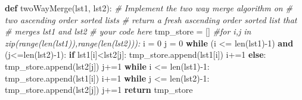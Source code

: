 \documentclass[
]{article}
\newenvironment{Shaded}{}{}
\newcommand{\BuiltInTok}[1]{\textcolor[rgb]{0.00,0.50,0.00}{#1}}
\newcommand{\CommentTok}[1]{\textcolor[rgb]{0.38,0.63,0.69}{\textit{#1}}}
\newcommand{\ControlFlowTok}[1]{\textcolor[rgb]{0.00,0.44,0.13}{\textbf{#1}}}
\newcommand{\DecValTok}[1]{\textcolor[rgb]{0.25,0.63,0.44}{#1}}
\newcommand{\KeywordTok}[1]{\textcolor[rgb]{0.00,0.44,0.13}{\textbf{#1}}}
\newcommand{\NormalTok}[1]{#1}
\newcommand{\OperatorTok}[1]{\textcolor[rgb]{0.40,0.40,0.40}{#1}}
\begin{document}
\begin{Shaded}
\begin{Highlighting}[]
\KeywordTok{def}\NormalTok{ twoWayMerge(lst1, lst2):}
    \CommentTok{\# Implement the two way merge algorithm on }
    \CommentTok{\#          two ascending order sorted lists}
    \CommentTok{\# return a fresh ascending order sorted list that }
    \CommentTok{\#          merges lst1 and lst2}
    \CommentTok{\# your code here}
\NormalTok{    tmp\_store }\OperatorTok{=}\NormalTok{ []}
    \CommentTok{\#for i,j in zip(range(len(lst1)),range(len(lst2))):}
\NormalTok{    i }\OperatorTok{=} \DecValTok{0}
\NormalTok{    j }\OperatorTok{=} \DecValTok{0}
    \ControlFlowTok{while}\NormalTok{ (i }\OperatorTok{\textless{}=} \BuiltInTok{len}\NormalTok{(lst1)}\OperatorTok{{-}}\DecValTok{1}\NormalTok{) }\KeywordTok{and}\NormalTok{ (j}\OperatorTok{\textless{}=}\BuiltInTok{len}\NormalTok{(lst2)}\OperatorTok{{-}}\DecValTok{1}\NormalTok{):}
        \ControlFlowTok{if}\NormalTok{ lst1[i]}\OperatorTok{\textless{}}\NormalTok{lst2[j]:}
\NormalTok{            tmp\_store.append(lst1[i])}
\NormalTok{            i}\OperatorTok{+=}\DecValTok{1}
        \ControlFlowTok{else}\NormalTok{:}
\NormalTok{            tmp\_store.append(lst2[j])}
\NormalTok{            j}\OperatorTok{+=}\DecValTok{1}
    \ControlFlowTok{while}\NormalTok{ i }\OperatorTok{\textless{}=} \BuiltInTok{len}\NormalTok{(lst1)}\OperatorTok{{-}}\DecValTok{1}\NormalTok{:}
\NormalTok{        tmp\_store.append(lst1[i])}
\NormalTok{        i}\OperatorTok{+=}\DecValTok{1}
    \ControlFlowTok{while}\NormalTok{ j }\OperatorTok{\textless{}=} \BuiltInTok{len}\NormalTok{(lst2)}\OperatorTok{{-}}\DecValTok{1}\NormalTok{:}
\NormalTok{        tmp\_store.append(lst2[j])}
\NormalTok{        j}\OperatorTok{+=}\DecValTok{1}
    \ControlFlowTok{return}\NormalTok{ tmp\_store}

\end{Highlighting}
\end{Shaded}
\end{document}

